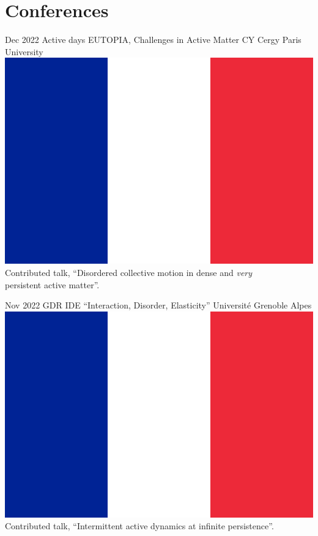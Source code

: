 \documentclass[letterpaper]{cvtemplate_en} %
\begin{document}
\newpage 


\vspace{3.25mm}
\section{Conferences}

\begin{cvbody}

\cvitem
	{Dec 2022}
	{}
	{Active days EUTOPIA, Challenges in Active Matter}
	{CY Cergy Paris University \includegraphics[height=0.8\myheight]{fr}\vspace{-5pt}}
	{}{}{}
	{}
	{Contributed talk, ``Disordered collective motion in dense and \textit{very}\\ persistent active matter''.\\}

\cvitem
	{Nov 2022}
	{}
	{GDR IDE ``Interaction, Disorder, Elasticity''}
	{Universit\'e Grenoble Alpes \includegraphics[height=0.8\myheight]{fr}}
	{}{}{}
	{}
	{Contributed talk, ``Intermittent active dynamics at infinite persistence''.\\}


\end{cvbody}
\end{document}
